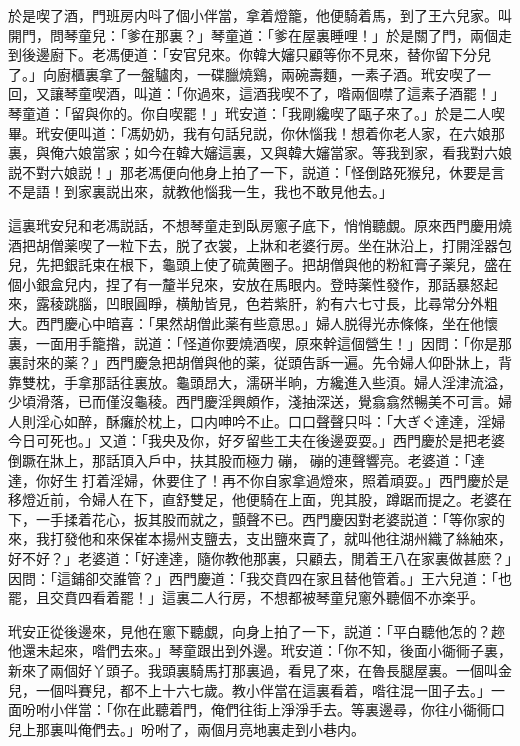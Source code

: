 於是喫了酒，門班房内呌了個小伴當，拿着燈籠，他便騎着馬，到了王六兒家。叫開門，問琴童兒：「爹在那裏？」琴童道：「爹在屋裏睡哩！」於是關了門，兩個走到後邊廚下。老馮便道：「安官兒來。你韓大嬸只顧等你不見來，替你留下分兒了。」向廚櫃裏拿了一盤驢肉，一碟臘燒鷄，兩碗壽麵，一素子酒。玳安喫了一回，又讓琴童喫酒，叫道：「你過來，這酒我喫不了，喒兩個噤了這素子酒罷！」琴童道：「留與你的。你自喫罷！」玳安道：「我剛纔喫了甌子來了。」於是二人喫畢。玳安便叫道：「馮奶奶，我有句話兒説，你休惱我！想着你老人家，在六娘那裏，與俺六娘當家；如今在韓大嬸這裏，又與韓大嬸當家。等我到家，看我對六娘説不對六娘説！」那老馮便向他身上拍了一下，説道：「怪倒路死猴兒，休要是言不是語！到家裏説出來，就教他惱我一生，我也不敢見他去。」

這裏玳安兒和老馮説話，不想琴童走到臥房窻子底下，悄悄聽覷。原來西門慶用燒酒把胡僧薬喫了一粒下去，脱了衣裳，上牀和老婆行房。坐在牀沿上，打開淫器包兒，先把銀託束在根下，龜頭上使了硫黄圈子。把胡僧與他的粉紅膏子薬兒，盛在個小銀盒兒内，捏了有一釐半兒來，安放在馬眼内。登時薬性發作，那話暴怒起來，露稜跳腦，凹眼圓睜，横觔皆見，色若紫肝，約有六七寸長，比尋常分外粗大。西門慶心中暗喜：「果然胡僧此薬有些意思。」婦人脱得光赤條條，坐在他懷裏，一面用手籠揝，説道：「怪道你要燒酒喫，原來幹這個營生！」因問：「你是那裏討來的薬？」西門慶急把胡僧與他的薬，従頭告訴一遍。先令婦人仰卧牀上，背靠雙枕，手拿那話往裏放。龜頭昂大，濡硏半晌，方纔進入些湏。婦人淫津流溢，少頃滑落，已而僅沒龜稜。西門慶淫興頗作，淺抽深送，覺翕翕然暢美不可言。婦人則淫心如醉，酥癱於枕上，口内呻吟不止。口口聲聲只呌：「大ぎぐ達達，淫婦今日可死也。」又道：「我央及你，好歹留些工夫在後邊耍耍。」西門慶於是把老婆倒蹶在牀上，那話頂入戶中，扶其股而極力𢵞磞，𢵞磞的連聲響亮。老婆道：「達達，你好生𢵞打着淫婦，休要住了！再不你自家拿過燈來，照着頑耍。」西門慶於是移燈近前，令婦人在下，直舒雙足，他便騎在上面，兜其股，蹲踞而提之。老婆在下，一手揉着花心，扳其股而就之，顫聲不已。西門慶因對老婆説道：「等你家的來，我打發他和來保崔本揚州支鹽去，支出鹽來賣了，就叫他往湖州織了絲紬來，好不好？」老婆道：「好達達，隨你教他那裏，只顧去，閒着王八在家裏做甚麽？」因問：「這鋪卻交誰管？」西門慶道：「我交賁四在家且替他管着。」王六兒道：「也罷，且交賁四看着罷！」這裏二人行房，不想都被琴童兒窻外聽個不亦楽乎。

玳安正從後邊來，見他在窻下聽覷，向身上拍了一下，説道：「平白聽他怎的？趂他還未起來，喒們去來。」琴童跟出到外邊。玳安道：「你不知，後面小衚衕子裏，新來了兩個好丫頭子。我頭裏騎馬打那裏過，看見了來，在魯長腿屋裏。一個叫金兒，一個呌賽兒，都不上十六七歲。教小伴當在這裏看着，喒往混一囬子去。」一面吩咐小伴當：「你在此聽着門，俺們往街上淨淨手去。等裏邊尋，你往小衚衕口兒上那裏叫俺們去。」吩咐了，兩個月亮地裏走到小巷内。


